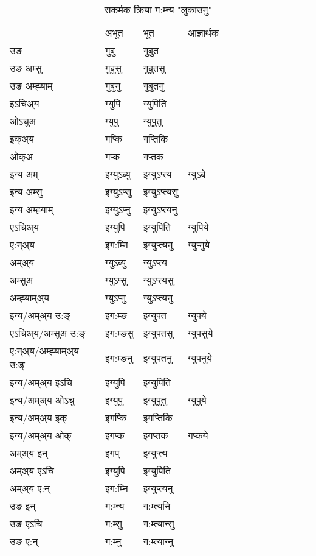 \begin{table}[H]
\label{up.vt} \centering
\caption{सकर्मक क्रिया  ग:म्‍न्य  "लुकाउनु"  }
\begin{tabular}{l|l|l|l|l|l|l|l|l|l|l|l|l}  \toprule
&अभूत & भूत & आज्ञार्थक \\ 
उङ &गुबु &गुबुत \\ 
उङ अम्सु &गुबुसु &गुबुतसु \\ 
उङ अम्ह्‍याम् &गुबुनु &गुबुतनु \\ 
इऽचिअ्य &ग्युपि &ग्युपिति   \\ 
ओऽचुअ &ग्युपु &ग्युपुतु   \\ 
इक्अ्य &गप्कि &गप्‍तिकि   \\ 
ओक्अ &गप्क &गप्‍तक   \\ 
इन्य अम् & इग्युऽब्यु  & इग्युऽप्‍त्य &ग्युऽबे  \\ 
इन्य अम्सु & इग्युऽप्सु  & इग्युऽप्‍त्यसु   \\ 
इन्य अम्ह्‍याम् & इग्युऽप्‍नु  & इग्युऽप्‍त्यनु   \\ 
एऽचिअ्य & इग्युपि & इग्युपिति &ग्युपिये    \\ 
ए:न्अ्य & इग:म्‍नि  & इग्युप्‍त्यनु &ग्युप्‍नुये  \\ 
अम्अ्य & ग्युऽब्यु  & ग्युऽप्‍त्य  \\ 
अम्सुअ & ग्युऽप्सु & ग्युऽप्‍त्यसु  \\ 
अम्ह्‍याम्अ्य & ग्युऽप्‍नु  & ग्युऽप्‍त्यनु \\ 
\midrule
इन्य/अम्अ्य उ:ङ्‌&इग:म्ङ & इग्युपत &ग्युपये \\ 
एऽचिअ्य/अम्सुअ उ:ङ्‌ &इग:म्ङसु & इग्युपतसु &ग्युपसुये \\ 
ए:न्अ्य/अम्ह्‍याम्अ्य उ:ङ्‌ &इग:म्ङनु & इग्युपतनु &ग्युपनुये \\ 
इन्य/अम्अ्य इऽचि & इग्युपि & इग्युपिति    \\ 
इन्य/अम्अ्य ओऽचु & इग्युपु & इग्युपुतु  &ग्युपुये  \\ 
इन्य/अम्अ्य इक् & इगप्कि & इगप्‍तिकि   \\ 
इन्य/अम्अ्य ओक् & इगप्क & इगप्‍तक  &गप्कये  \\ 
अम्अ्य इन् & इगप् & इग्युप्‍त्य   \\ 
अम्अ्य एऽचि & इग्युपि & इग्युपिति    \\ 
अम्अ्य ए:न् & इग:म्‍नि  & इग्युप्‍त्यनु  \\ 
\midrule
उङ इन् & ग:म्‍न्य  & ग:म्त्यनि  \\ 
उङ एऽचि & ग:म्सु  & ग:म्त्यान्सु   \\ 
उङ ए:न्& ग:म्‍नु  & ग:म्त्यान्‍नु   \\ 
\bottomrule
\end{tabular}
\end{table}


